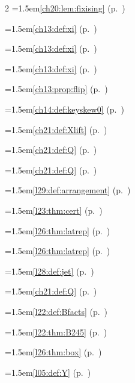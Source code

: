 \begin{multicols}{2}
\hangindent=1.5em\quad \ref{ch20:lem:fixising} (p.~\pageref{ch20:lem:fixising})\par
\hangindent=1.5em\quad \ref{ch13:def:xi} (p.~\pageref{ch13:def:xi})\par
\hangindent=1.5em\quad \ref{ch13:def:xi} (p.~\pageref{ch13:def:xi})\par
\hangindent=1.5em\quad \ref{ch13:def:xi} (p.~\pageref{ch13:def:xi})\par
\hangindent=1.5em\quad \ref{ch13:prop:flip} (p.~\pageref{ch13:prop:flip})\par
\hangindent=1.5em\quad \ref{ch14:def:keyskew0} (p.~\pageref{ch14:def:keyskew0})\par
\hangindent=1.5em\quad \ref{ch21:def:Xlift} (p.~\pageref{ch21:def:Xlift})\par
\hangindent=1.5em\quad \ref{ch21:def:Q} (p.~\pageref{ch21:def:Q})\par
\hangindent=1.5em\quad \ref{ch21:def:Q} (p.~\pageref{ch21:def:Q})\par
\hangindent=1.5em\quad \ref{l29:def:arrangement} (p.~\pageref{l29:def:arrangement})\par
\hangindent=1.5em\quad \ref{l23:thm:cert} (p.~\pageref{l23:thm:cert})\par
\hangindent=1.5em\quad \ref{l26:thm:latrep} (p.~\pageref{l26:thm:latrep})\par
\hangindent=1.5em\quad \ref{l26:thm:latrep} (p.~\pageref{l26:thm:latrep})\par
\hangindent=1.5em\quad \ref{l28:def:jet} (p.~\pageref{l28:def:jet})\par
\hangindent=1.5em\quad \ref{ch21:def:Q} (p.~\pageref{ch21:def:Q})\par
\hangindent=1.5em\quad \ref{l22:def:Bfacts} (p.~\pageref{l22:def:Bfacts})\par
\hangindent=1.5em\quad \ref{l22:thm:B245} (p.~\pageref{l22:thm:B245})\par
\hangindent=1.5em\quad \ref{l26:thm:box} (p.~\pageref{l26:thm:box})\par
\par{}\par\nopagebreak\smallskip
\hangindent=1.5em\quad \ref{l05:def:Y} (p.~\pageref{l05:def:Y})\par

\end{multicols}
